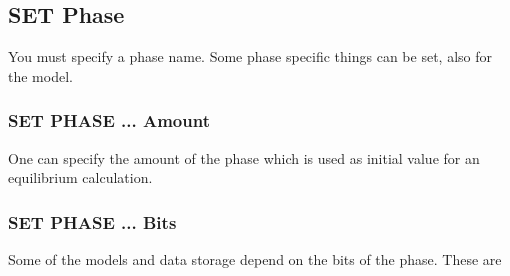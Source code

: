 \documentclass[12pt]{article}
\begin{document}
\subsection{SET Phase}

You must specify a phase name.  Some phase specific things can be set,
also for the model.

\subsubsection{SET PHASE ... Amount}

One can specify the amount of the phase which is used as initial value
for an equilibrium calculation.

\subsubsection{SET PHASE ... Bits}

Some of the models and data storage depend on the bits of the phase.
These are
\end{document}
